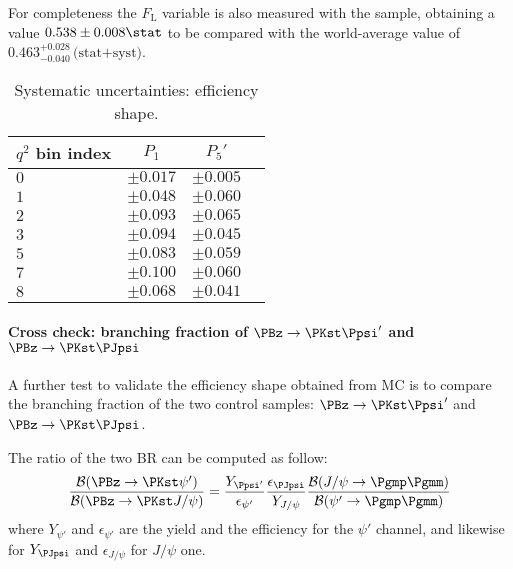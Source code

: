 For completeness the $F_\mathrm{L}$ variable is also measured with the \BtoKstpsip sample, obtaining a value $0.538 \pm 0.008\stat$ to be compared with the world-average value of $0.463^{+0.028}_{-0.040}\,\text{(stat+syst)}$.

\begin{table*}[!htb]
  \begin {center}
    \begin{small}
      \caption{Systematic uncertainties: efficiency shape.
        \label{tab:eff.shape}}
      \begin{tabular}{l|c|c|c}
        $q^2$ bin index  & $P_1$ & $P_5'$  \\
        \hline
        $ 0 $ & $\pm0.017$ & $\pm0.005$ \\
        $ 1 $ & $\pm0.048$ & $\pm0.060$ \\
        $ 2 $ & $\pm0.093$ & $\pm0.065$ \\
        $ 3 $ & $\pm0.094$ & $\pm0.045$ \\
        $ 5 $ & $\pm0.083$ & $\pm0.059$ \\
        $ 7 $ & $\pm0.100$ & $\pm0.060$ \\
        $ 8 $ & $\pm0.068$ & $\pm0.041$ \\
      \end{tabular}
    \end{small}
  \end{center}
\end{table*}

\paragraph{Cross check: branching fraction of $\PBz\to\PKst\Ppsi'$ and $\PBz\to\PKst\PJpsi$ }

A further test to validate the efficiency shape obtained from MC is to compare the branching fraction of the two control samples: $\PBz\to\PKst\Ppsi'$ and $\PBz\to\PKst\PJpsi$.

The ratio of the two BR can be computed as follow:
\begin{equation}\label{RBRatio}
  \frac{\mathcal{B}(\PBz\to\PKst\psi')}{\mathcal{B}(\PBz\to\PKst J/\psi)}
  = \frac{Y_{\Ppsi'}}{\epsilon_{\psi'}}\frac{\epsilon_{\PJpsi}}{Y_{J/\psi}}
  \frac{\mathcal{B}(J/\psi \to \Pgmp \Pgmm)}{\mathcal{B}(\psi' \to \Pgmp \Pgmm)}
\end{equation}
where $Y_{\psi'}$ and $\epsilon_{\psi'}$ are the yield and the efficiency for the $\psi'$ channel, and likewise for $Y_{\PJpsi}$ and $\epsilon_{J/\psi}$ for $J/\psi$ one.

